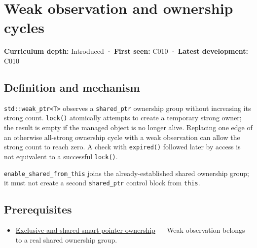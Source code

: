 \hypertarget{appendix-b9548675eb2b}{}\label{referencestart:appendix-b9548675eb2b}
\section{Weak observation and ownership cycles}\label{appendix-b9548675eb2b-weak-observation-and-ownership-cycles}

\hypertarget{appendix-b9548675eb2b-weak-observation-and-ownership-cycles}{}

\textbf{Curriculum depth:} Introduced · \textbf{First seen:} C010 · \textbf{Latest development:} C010

\begin{allmightroledefinition}

\subsection{Definition and mechanism}\label{appendix-b9548675eb2b-definition-and-mechanism}

\hypertarget{appendix-b9548675eb2b-definition-and-mechanism}{}

\texttt{std::weak\_ptr\textless{}T\textgreater{}} observes a \texttt{shared\_ptr} ownership group without increasing its strong count. \texttt{lock()} atomically attempts to create a temporary strong owner; the result is empty if the managed object is no longer alive. Replacing one edge of an otherwise all-strong ownership cycle with a weak observation can allow the strong count to reach zero. A check with \texttt{expired()} followed later by access is not equivalent to a successful \texttt{lock()}.

\end{allmightroledefinition}

\texttt{enable\_shared\_from\_this} joins the already-established shared ownership group; it must not create a second \texttt{shared\_ptr} control block from \texttt{this}.

\subsection{Prerequisites}\label{appendix-b9548675eb2b-prerequisites}

\hypertarget{appendix-b9548675eb2b-prerequisites}{}

\begin{itemize}
\tightlist
\item
  \hyperref[appendix-51602cabe815]{Exclusive and shared smart-pointer ownership} --- Weak observation belongs to a real shared ownership group.
\end{itemize}

